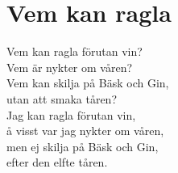 \section{Vem kan ragla}
Vem kan ragla förutan vin?\\
Vem är nykter om våren?\\
Vem kan skilja på Bäsk och Gin,\\
utan att smaka tåren?\\

Jag kan ragla förutan vin,\\
å visst var jag nykter om våren,\\
men ej skilja på Bäsk och Gin,\\
efter den elfte tåren.\\